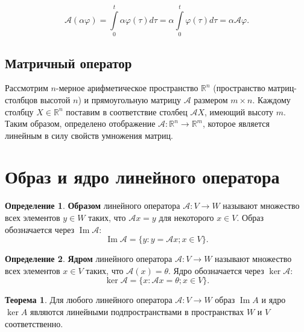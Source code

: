 \documentclass[a5paper, 11pt]{extbook}
\theoremstyle{definition}
\newtheorem{theorem}{Теорема}[chapter]
\theoremstyle{definition}
\newtheorem{definition}{Определение}[chapter]
\DeclareMathOperator{\Ima}{Im}
\begin{document}
\[
    \mathcal{A} (\alpha \varphi) =
    \int\limits_0^t \alpha \varphi(\tau) d\tau = \alpha \int\limits_0^t \varphi(\tau) d\tau = \alpha \mathcal{A} \varphi.
\]

\subsection{Матричный оператор}

Рассмотрим \(n\)-мерное арифметическое пространство \(\mathbb{R}^n\) (пространство матриц-столбцов высотой \(n\)) и прямоугольную матрицу \(\mathcal{A}\) размером \(m \times n\). Каждому столбцу \(X \in \mathbb{R}^n\) поставим в соответствие столбец \(\mathcal{A} X\), имеющий высоту \(m\). Таким образом, определено отображение \(\mathcal{A}: \mathbb{R}^n \to \mathbb{R}^m\), которое является линейным в силу свойств умножения матриц.

\section{Образ и ядро линейного оператора}

\begin{definition}
    \textbf{Образом} линейного оператора \(\mathcal{A}: V \to W\) называют множество всех элементов \(y \in W\) таких, что \(\mathcal{A} x = y\) для некоторого \(x \in V\). Образ обозначается через \(\Ima \mathcal{A}\):
    \[
        \Ima \mathcal{A} = \{y: y = \mathcal{A} x; x \in V\}.
    \]
\end{definition}

\begin{definition}
    \textbf{Ядром} линейного оператора \(\mathcal{A}: V \to W\) называют множество всех элементов \(x \in V\) таких, что \(\mathcal{A}(x) = \theta\). Ядро обозначается через \(\ker \mathcal{A}\):
    \[
        \ker \mathcal{A} = \{x: \mathcal{A} x = \theta; x \in V\}.
    \]
\end{definition}

\begin{theorem}
    Для любого линейного оператора \(\mathcal{A}: V \to W\) образ \(\Ima A\) и ядро \(\ker A\) являются линейными подпространствами в пространствах \(W\) и \(V\) соответственно.
\end{theorem}
\end{document}

